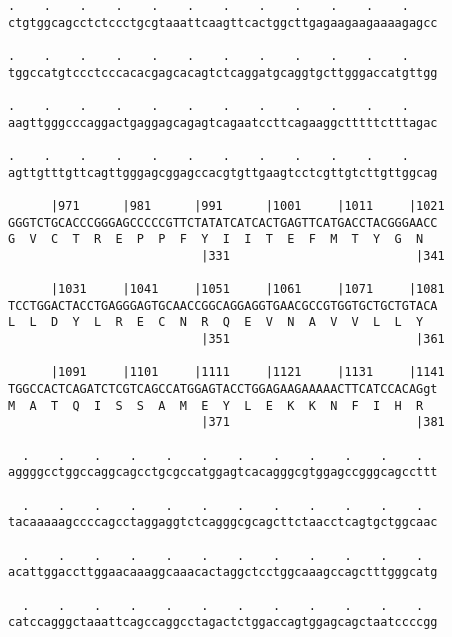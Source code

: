 \documentclass{article}
\begin{document}
\begin{Verbatim}
.    .    .    .    .    .    .    .    .    .    .    .    
ctgtggcagcctctccctgcgtaaattcaagttcactggcttgagaagaagaaaagagcc
                                                            
.    .    .    .    .    .    .    .    .    .    .    .    
tggccatgtccctcccacacgagcacagtctcaggatgcaggtgcttgggaccatgttgg
                                                            
.    .    .    .    .    .    .    .    .    .    .    .    
aagttgggcccaggactgaggagcagagtcagaatccttcagaaggctttttctttagac
                                                            
.    .    .    .    .    .    .    .    .    .    .    .    
agttgtttgttcagttgggagcggagccacgtgttgaagtcctcgttgtcttgttggcag
                                                            
      |971      |981      |991      |1001     |1011     |1021
GGGTCTGCACCCGGGAGCCCCCGTTCTATATCATCACTGAGTTCATGACCTACGGGAACC
G  V  C  T  R  E  P  P  F  Y  I  I  T  E  F  M  T  Y  G  N  
                           |331                          |341
  
      |1031     |1041     |1051     |1061     |1071     |1081
TCCTGGACTACCTGAGGGAGTGCAACCGGCAGGAGGTGAACGCCGTGGTGCTGCTGTACA
L  L  D  Y  L  R  E  C  N  R  Q  E  V  N  A  V  V  L  L  Y  
                           |351                          |361
  
      |1091     |1101     |1111     |1121     |1131     |1141
TGGCCACTCAGATCTCGTCAGCCATGGAGTACCTGGAGAAGAAAAACTTCATCCACAGgt
M  A  T  Q  I  S  S  A  M  E  Y  L  E  K  K  N  F  I  H  R  
                           |371                          |381
  
  .    .    .    .    .    .    .    .    .    .    .    .  
aggggcctggccaggcagcctgcgccatggagtcacagggcgtggagccgggcagccttt
                                                            
  .    .    .    .    .    .    .    .    .    .    .    .  
tacaaaaagccccagcctaggaggtctcagggcgcagcttctaacctcagtgctggcaac
                                                            
  .    .    .    .    .    .    .    .    .    .    .    .  
acattggaccttggaacaaaggcaaacactaggctcctggcaaagccagctttgggcatg
                                                            
  .    .    .    .    .    .    .    .    .    .    .    .  
catccagggctaaattcagccaggcctagactctggaccagtggagcagctaatccccgg
                                                            

\end{Verbatim}
\end{document}

